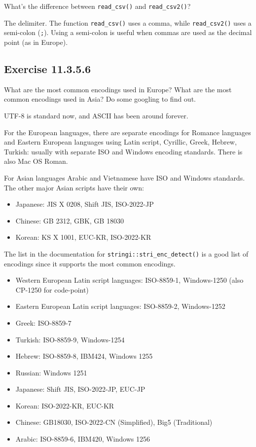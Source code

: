 \documentclass[]{book}
\providecommand{\tightlist}{%
  \setlength{\itemsep}{0pt}\setlength{\parskip}{0pt}}
\theoremstyle{plain}
\theoremstyle{remark}
\begin{document}
What's the difference between \texttt{read\_csv()} and
\texttt{read\_csv2()}?

The delimiter. The function \texttt{read\_csv()} uses a comma, while
\texttt{read\_csv2()} uses a semi-colon (\texttt{;}). Using a semi-colon
is useful when commas are used as the decimal point (as in Europe).

\hypertarget{exercise-11.3.5.6}{%
\subsection*{\texorpdfstring{Exercise
{11.3.5.6}}{Exercise 11.3.5.6}}\label{exercise-11.3.5.6}}

What are the most common encodings used in Europe? What are the most
common encodings used in Asia? Do some googling to find out.

UTF-8 is standard now, and ASCII has been around forever.

For the European languages, there are separate encodings for Romance
languages and Eastern European languages using Latin script, Cyrillic,
Greek, Hebrew, Turkish: usually with separate ISO and Windows encoding
standards. There is also Mac OS Roman.

For Asian languages Arabic and Vietnamese have ISO and Windows
standards. The other major Asian scripts have their own:

\begin{itemize}
\tightlist
\item
  Japanese: JIS X 0208, Shift JIS, ISO-2022-JP
\item
  Chinese: GB 2312, GBK, GB 18030
\item
  Korean: KS X 1001, EUC-KR, ISO-2022-KR
\end{itemize}

The list in the documentation for \texttt{stringi::stri\_enc\_detect()}
is a good list of encodings since it supports the most common encodings.

\begin{itemize}
\tightlist
\item
  Western European Latin script languages: ISO-8859-1, Windows-1250
  (also CP-1250 for code-point)
\item
  Eastern European Latin script languages: ISO-8859-2, Windows-1252
\item
  Greek: ISO-8859-7
\item
  Turkish: ISO-8859-9, Windows-1254
\item
  Hebrew: ISO-8859-8, IBM424, Windows 1255
\item
  Russian: Windows 1251
\item
  Japanese: Shift JIS, ISO-2022-JP, EUC-JP
\item
  Korean: ISO-2022-KR, EUC-KR
\item
  Chinese: GB18030, ISO-2022-CN (Simplified), Big5 (Traditional)
\item
  Arabic: ISO-8859-6, IBM420, Windows 1256
\end{itemize}
\end{document}
